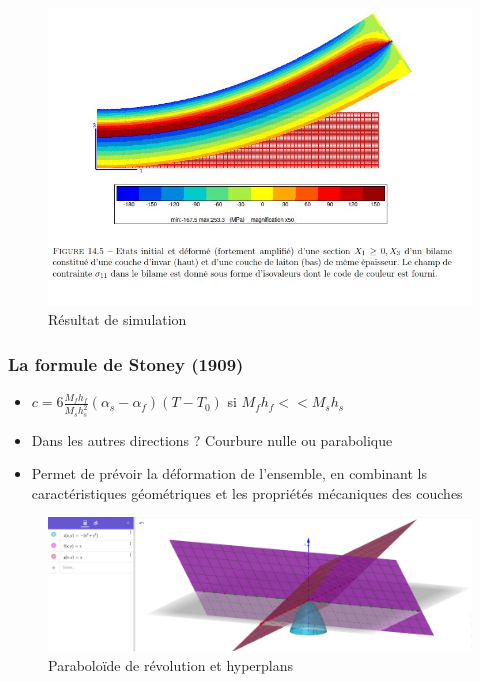 \documentclass{beamer}
\begin{document}
\begin{frame}
    \begin{figure}
        \centering
        \includegraphics[scale=0.2]{imgs/deformation.JPG}
        \caption{Résultat de simulation}
    \end{figure}
    
\end{frame}

\begin{frame}
    \frametitle{La formule de Stoney (1909)}

    \begin{itemize}
        \item $c = 6\frac{M_fh_f}{M_sh_s^2}(\alpha_s-\alpha_f)(T-T_0)$ si $M_fh_f << M_sh_s$ 
        \item Dans les autres directions ? Courbure nulle ou parabolique
        \item Permet de prévoir la déformation de l'ensemble, en combinant ls caractéristiques géométriques et les propriétés mécaniques des couches
    \end{itemize}
    
    \begin{figure}
        \centering
        \includegraphics[scale=0.25]{imgs/courbes.png}
        \caption{Paraboloïde de révolution et hyperplans}
    \end{figure}
    
\end{frame}
\end{document}

